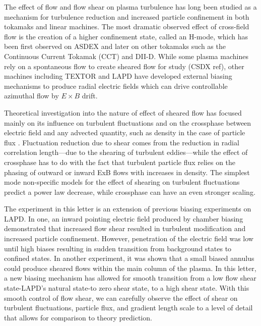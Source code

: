 \documentclass[%
 aps,
 prl,
 amsmath,amssymb,
 reprint,%
]{revtex4-1}
\begin{document}
\maketitle


	The effect of flow and flow shear on plasma turbulence has long been studied as a mechanism for turbulence reduction and increased particle confinement in both tokamaks and linear machines.  The most dramatic observed effect of cross-field flow is the creation of a higher confinement state, called an H-mode, which has been first observed on ASDEX\cite{wagner82} and later on other tokamaks such as the Continuous Current Tokamak (CCT)\cite{taylor89,tynan92} and DII-D\cite{groebner90,moyer95}. While some plasma machines rely on a spontaneous flow to create sheared flow for study (CSDX ref), other machines including TEXTOR\cite{boedo00} and LAPD\cite{maggs07,carter09} have developed external biasing mechanisms to produce radial electric fields which can drive controllable azimuthal flow by $E \times B$ drift\cite{weynants93}.
	
Theoretical investigation into the nature of effect of sheared flow has focused mainly on its influence on turbulent fluctuations \cite{biglari90} and on the crossphase between electric field and any advected quantity, such as density in the case of particle flux \cite{ware96,terry01}. Fluctuation reduction due to shear comes from the reduction in radial correlation length---due to the shearing of turbulent eddies---while the effect of crossphase has to do with the fact that turbulent particle flux relies on the phasing of outward or inward ExB flows with increases in density. The simplest mode non-specific models for the effect of shearing on turbulent fluctuations predict a power law decrease\cite{biglari90}, while crossphase can have an even stronger scaling\cite{terry01}.

The experiment in this letter is an extension of previous biasing experiments on LAPD. In one, an inward pointing electric field produced by chamber biasing demonstrated that increased flow shear resulted in turbulent modification and increased particle confinement\cite{carter09}. However, penetration of the electric field was low until high biases resulting in sudden transition from background states to confined states. In another experiment, it was shown that a small biased annulus could produce sheared flows within the main column of the plasma\cite{zhou12}. In this letter, a new biasing mechanism has allowed for smooth transition from a low flow shear state-LAPD's natural state-to zero shear state, to a high shear state. With this smooth control of flow shear, we can carefully observe the effect of shear on turbulent fluctuations, particle flux, and gradient length scale to a level of detail that allows for comparison to theory prediction.
\end{document}
